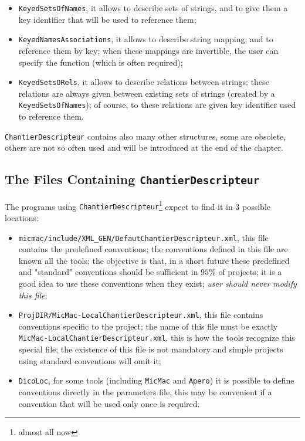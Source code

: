 \begin{itemize}
   \item  {\tt KeyedSetsOfNames}, it allows to describe sets of strings, and to give them
          a key identifier that will be used to reference them;

   \item  {\tt KeyedNamesAssociations}, it allows to describe string mapping,  and
          to reference them by key; when these mappings are invertible, the user can
          specify the  function %
           (which is often required);

   \item  {\tt KeyedSetsORels}, it allows to describe relations between  strings;
          these relations are always given between existing sets of strings
          (created by a {\tt KeyedSetsOfNames}); of course, to these relations are
          given key identifier used to reference them.
\end{itemize}

{\tt ChantierDescripteur} contains also many other structures, some are 
obsolete, others are not so often used and will be introduced at the end of the chapter.


\subsection{The Files Containing {\tt ChantierDescripteur}}

The programs using {\tt ChantierDescripteur}\footnote{almost all now} expect to
find it in 3 possible locations:


\begin{itemize}

   \item {\tt micmac/include/XML\_GEN/DefautChantierDescripteur.xml}, this file contains the
         predefined conventions; the conventions defined in this file are known  all the
         tools; the objective is that, in a short future these predefined and "standard"
         conventions should be sufficient in $95\%$  of projects; it is a good idea
         to use these conventions when they exist; \emph{user should never modify this file};
    

   \item {\tt ProjDIR/MicMac-LocalChantierDescripteur.xml}, this file contains conventions
         specific to the project; the name of this file
         must be exactly {\tt MicMac-LocalChantierDescripteur.xml}, this is how the
         tools recognize this special file; the existence of this file is not mandatory
         and simple projects using standard conventions will  omit it;

   \item {\tt DicoLoc}, for some tools (including {\tt MicMac} and {\tt Apero}) it is possible
         to define conventions directly in the parameters file, this may be convenient if
         a convention that will be used only once is required.

\end{itemize}

